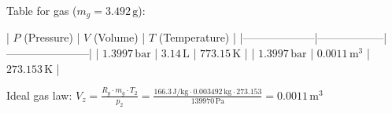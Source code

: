 Table for gas (\( m_g = 3.492 \, \text{g} \)):  

| \( P \) (Pressure) | \( V \) (Volume) | \( T \) (Temperature) |  
|--------------------|------------------|-----------------------|  
| \( 1.3997 \, \text{bar} \) | \( 3.14 \, \text{L} \) | \( 773.15 \, \text{K} \) |  
| \( 1.3997 \, \text{bar} \) | \( 0.0011 \, \text{m}^3 \) | \( 273.153 \, \text{K} \) |  

Ideal gas law:  
\( V_z = \frac{R_g \cdot m_g \cdot T_2}{p_2} = \frac{166.3 \, \text{J/kg} \cdot 0.003492 \, \text{kg} \cdot 273.153}{139970 \, \text{Pa}} = 0.0011 \, \text{m}^3 \)